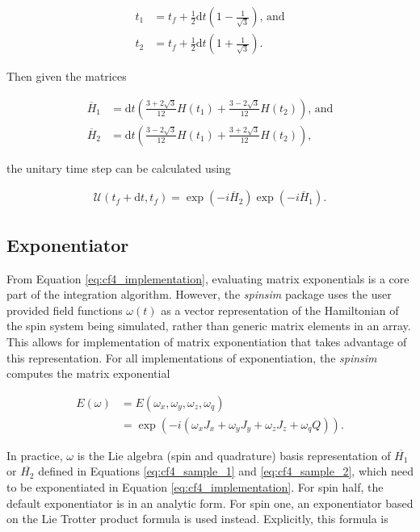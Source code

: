 \documentclass{jors}
\begin{document}
		\begin{align}
			t_1 &= t_f + \frac12 \mathrm{d}t\left(1 - \frac{1}{\sqrt{3}}\right)\textrm{, and}\\
			t_2 &= t_f + \frac12 \mathrm{d}t\left(1 + \frac{1}{\sqrt{3}}\right).
		\end{align}
		
		Then given the matrices
		
		\begin{align}
			\overline{H}_1 &= \mathrm{d}t\left(\frac{3 + 2\sqrt{3}}{12}H(t_1) + \frac{3 - 2\sqrt{3}}{12}H(t_2)\right)\textrm{, and}\label{eq:cf4_sample_1}\\
			\overline{H}_2 &= \mathrm{d}t\left(\frac{3 - 2\sqrt{3}}{12}H(t_1) + \frac{3 + 2\sqrt{3}}{12}H(t_2)\right),\label{eq:cf4_sample_2}
		\end{align}

		the unitary time step can be calculated using

		\begin{align}
			\mathcal{U}(t_f + \mathrm{d}t, t_f) = \exp(-i\overline{H}_2)\exp(-i\overline{H}_1).\label{eq:cf4_implementation}
		\end{align}

	\subsection{Exponentiator}
		From Equation \eqref{eq:cf4_implementation}, evaluating matrix exponentials is a core part of the integration algorithm.
		However, the \emph{spinsim} package uses the user provided field functions \(\omega(t)\) as a vector representation of the Hamiltonian of the spin system being simulated, rather than generic matrix elements in an array.
		This allows for implementation of matrix exponentiation that takes advantage of this representation.
		For all implementations of exponentiation, the \emph{spinsim} computes the matrix exponential
		
		\begin{align}
			E(\omega) &= E(\omega_x, \omega_y, \omega_z, \omega_q)\\
			&= \exp(-i (\omega_x J_x + \omega_y J_y + \omega_z J_z + \omega_q Q)).
		\end{align}
		
		In practice, \(\omega\) is the Lie algebra (spin and quadrature) basis representation of \(\overline{H_1}\) or \(\overline{H_2}\) defined in Equations \eqref{eq:cf4_sample_1} and \eqref{eq:cf4_sample_2}, which need to be exponentiated in Equation \eqref{eq:cf4_implementation}.
		For spin half, the default exponentiator is in an analytic form.
		For spin one, an exponentiator based on the Lie Trotter product formula \cite{moler_nineteen_2003} is used instead.
		Explicitly, this formula is
		
\end{document}
